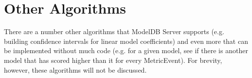 \section{Other Algorithms}
There are a number other algorithms that ModelDB Server supports (e.g. building confidence intervals
for linear model coefficients) and even more that can be implemented without much code (e.g. for a given model, see if there is another
model that has scored higher than it for every MetricEvent). For brevity, however, these algorithms will not be discussed.
